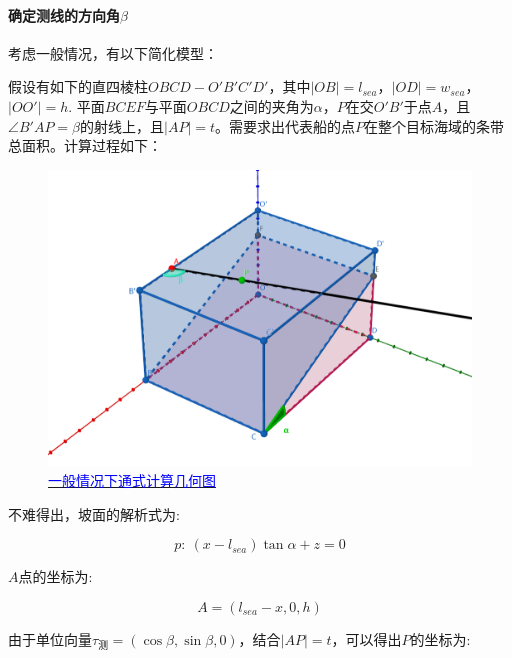 

\paragraph{确定测线的方向角$\beta$}

考虑一般情况，有以下简化模型：

假设有如下的直四棱柱$OBCD - O'B'C'D'$，其中$|OB| = l_{sea}$，$|OD| = w_{sea}$，$|OO'| = h$. 平面$BCEF$与平面$OBCD$之间的夹角为$\alpha$，$P$在交$O'B'$于点$A$，且$\angle B'AP = \beta$的射线上，且$|AP| = t$。需要求出代表船的点$P$在整个目标海域的条带总面积。计算过程如下：

\begin{figure}[h]
    \centering
    \includegraphics[scale=0.3]{res/img/一般情况下通式计算几何图.png}
    \caption{\href{https://www.geogebra.org/m/jzwhwcqr}{\textcolor{blue}{一般情况下通式计算几何图}}}
    \label{fig:一般情况下通式计算几何图}
\end{figure}

不难得出，坡面的解析式为:

\begin{equation}
    p: \
    (x - l_{sea})\tan \alpha + z = 0
\end{equation}

$A$点的坐标为:

\begin{equation}
    A = (l_{sea} - x, 0, h)
\end{equation}

由于单位向量$\tau_\text{测} = (\cos \beta, \sin \beta, 0)$，结合$|AP| = t$，可以得出$P$的坐标为:

